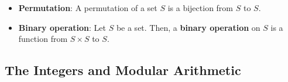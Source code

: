 \documentclass{report}
\begin{document}
\begin{itemize}
\begin{align*}
                \beta(t) = s
            .\end{align*}
            Then,
            \begin{align*}
                (\beta \alpha)(s) = \beta(\alpha(s)) = \beta(t) = s
            .\end{align*}
            Now, for any $t \in T$, choose $s \in S$ such that $\alpha(s) = t$. By that same property of $\beta$, 
            \begin{align*}
                \beta(t) = s
            ,\end{align*}
            so
            \begin{align*}
                (\alpha \beta)(t) = \alpha(\beta(t)) = \alpha(s) = t
            .\end{align*}
            Now, we just need to show that $\beta$ is a bijection. First, assume that $\beta(t_{1}) = \beta(t_{2})$. Then,
            \begin{align*}
                \alpha(\beta(t_{1})) &= t_{1}, \\
                \alpha(\beta(t_{2})) &= t_{2}
            .\end{align*}
            But, $\beta(t_{1}) = \beta(t_{2})$, so
            \begin{align*}
                \alpha(\beta(t_{2})) =  t_{2} = \alpha(\beta(t_{1})) = t_{1}
            .\end{align*}
            Thus, $\beta$ is injective. Next, $s \in S$, we have that
            \begin{align*}
                \beta(\alpha(s)) = s
            .\end{align*}
            Thus, there exists a $t \in T$ such that $\beta(t) = s$ ($t = \alpha(s)$), so $\beta$ is surjective. $\endpf$.
        \item \textbf{Permutation}: A permutation of a set $S$ is a bijection from $S$ to $S$.
        \item \textbf{Binary operation}: Let $S$ be a set. Then, a \textbf{binary operation} on $S$ is a function from $S \times S$ to $S$.


    \end{itemize}

    \pagebreak 
    \subsection{The Integers and Modular Arithmetic}
\end{document}
